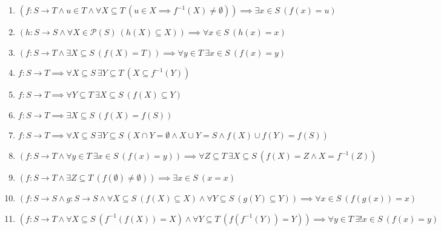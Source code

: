 \documentclass[11pt,a4paper]{article}
\begin{document}
\begin{enumerate}
\item $\displaystyle (f \colon S \to T \land u \in T \land \forall X \subseteq T\ (u \in X \implies f^{-1}(X) \neq \emptyset)) \implies \exists x \in S\ (f(x) = u)$
\item $\displaystyle (h \colon S \to S \land \forall X \in \mathcal{P}(S)\ (h(X) \subseteq X)) \implies \forall x \in S\ (h(x) = x)$
\item $\displaystyle (f \colon S \to T \land \exists X \subseteq S\ (f(X) = T)) \implies \forall y \in T\ \exists x \in S\ (f(x) = y)$
\item $\displaystyle f \colon S \to T \implies \forall X \subseteq S\ \exists Y \subseteq T\ (X \subseteq f^{-1}(Y))$
\item $\displaystyle f \colon S \to T \implies \forall Y \subseteq T\ \exists X \subseteq S\ (f(X) \subseteq Y)$
\item $\displaystyle f \colon S \to T \implies \exists X \subseteq S\ (f(X) = f(S))$
\item $\displaystyle f \colon S \to T \implies \forall X \subseteq S\ \exists Y \subseteq S\ (X \cap Y = \emptyset \land X \cup Y = S \land f(X) \cup f(Y) = f(S))$
\item $\displaystyle (f \colon S \to T \land \forall y \in T\ \exists x \in S\ (f(x) = y)) \implies \forall Z \subseteq T\ \exists X \subseteq S\ (f(X) = Z \land X = f^{-1}(Z))$
\item $\displaystyle (f \colon S \to T \land \exists Z \subseteq T\ (f(\emptyset) \neq \emptyset)) \implies \exists x \in S\ (x = x)$
\item $\displaystyle (f \colon S \to S \land g \colon S \to S \land \forall X \subseteq S\ (f(X) \subseteq X) \land \forall Y \subseteq S\ (g(Y) \subseteq Y)) \implies \forall x \in S\ (f(g(x)) = x)$
\item $\displaystyle (f \colon S \to T \land \forall X \subseteq S\ (f^{-1}(f(X)) = X) \land \forall Y \subseteq T\ (f(f^{-1}(Y)) = Y)) \implies \forall y \in T\ \exists! x \in S\ (f(x) = y)$
\end{enumerate}
\end{document}
